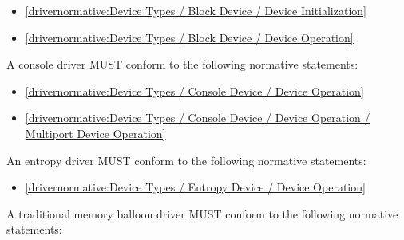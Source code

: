 \begin{itemize}
\item \ref{drivernormative:Device Types / Block Device / Device Initialization}
\item \ref{drivernormative:Device Types / Block Device / Device Operation}
\end{itemize}

\label{sec:Conformance / Driver Conformance / Console Driver Conformance}

A console driver MUST conform to the following normative statements:

\begin{itemize}
\item \ref{drivernormative:Device Types / Console Device / Device Operation}
\item \ref{drivernormative:Device Types / Console Device / Device Operation / Multiport Device Operation}
\end{itemize}

\label{sec:Conformance / Driver Conformance / Entropy Driver Conformance}

An entropy driver MUST conform to the following normative statements:

\begin{itemize}
\item \ref{drivernormative:Device Types / Entropy Device / Device Operation}
\end{itemize}

\label{sec:Conformance / Driver Conformance / Traditional Memory Balloon Driver Conformance}

A traditional memory balloon driver MUST conform to the following normative statements:

